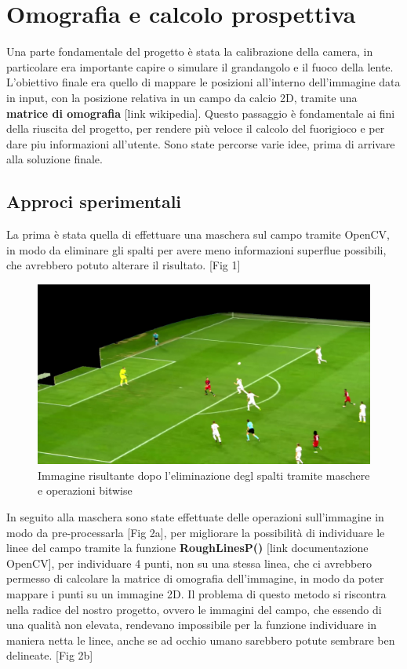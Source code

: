 \documentclass{article}
\author{Simone La Bella}
\date{May 2024}
\begin{document}
\section{Omografia e calcolo prospettiva}
Una parte fondamentale del progetto è stata la calibrazione della camera, in particolare era importante capire o simulare il grandangolo e il fuoco della lente. L'obiettivo finale era quello di mappare le posizioni all'interno dell'immagine data in input, con la posizione relativa in un campo da calcio 2D, tramite una \textbf{matrice di omografia} [link wikipedia]. 
Questo passaggio è fondamentale ai fini della riuscita del progetto, per rendere più veloce il calcolo del fuorigioco e per dare piu informazioni all'utente. Sono state percorse varie idee, prima di arrivare alla soluzione finale.
\\
\subsection{Approci sperimentali}
La prima è stata quella di effettuare una maschera sul campo tramite OpenCV, in modo da eliminare gli spalti per avere meno informazioni superflue possibili, che avrebbero potuto alterare il risultato. [Fig 1]  

\begin{figure}[h]
    \centering
    \includegraphics[width=0.7\linewidth]{capitoli/senzaSpalti.jpg}
    \caption{Immagine risultante dopo l'eliminazione degl spalti tramite maschere e operazioni bitwise}
    \label{fig:enter-label}
\end{figure}

In seguito alla maschera sono state effettuate delle operazioni sull'immagine in modo da pre-processarla [Fig 2a], per migliorare la possibilità di individuare le linee del campo tramite la funzione \textbf{RoughLinesP()} [link documentazione OpenCV], per individuare 4 punti, non su una stessa linea, che ci avrebbero permesso di calcolare la matrice di omografia dell'immagine, in modo da poter mappare i punti su un immagine 2D. Il problema di questo metodo si riscontra nella radice del nostro progetto, ovvero le immagini del campo, che essendo di una qualità non elevata, rendevano impossibile per la funzione individuare in maniera netta le linee, anche se ad occhio umano sarebbero potute sembrare ben delineate. [Fig 2b] 
\end{document}
